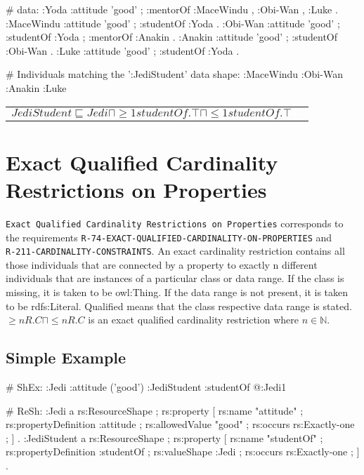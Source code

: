 \documentclass{llncs}
\newcommand{\ms}[1]{\texttt{#1}}
\newenvironment{DL}{
  \vspace{0cm}
	\begin{center}
  \begin{tabular}{r l}

}{
  \end{tabular}
	\end{center}
}
\newcommand{\tb}[1]{\todo[size=\small, color=blue!40]{\textbf{Thomas:} #1}}
\begin{document}
\begin{ex}
# data:
:Yoda 
    :attitude 'good' ;
    :mentorOf :MaceWindu , :Obi-Wan , :Luke .
:MaceWindu
    :attitude 'good' ;
    :studentOf :Yoda .
:Obi-Wan 
    :attitude 'good' ;
    :studentOf :Yoda ;
    :mentorOf :Anakin .
:Anakin
    :attitude 'good' ; 
    :studentOf :Obi-Wan .
:Luke
    :attitude 'good' ;
    :studentOf :Yoda .
\end{ex}

\begin{ex}
# Individuals matching the ’:JediStudent’ data shape:
:MaceWindu :Obi-Wan :Anakin :Luke
\end{ex}

\begin{DL}
$JediStudent \sqsubseteq Jedi \sqcap \geq1 studentOf.\top \sqcap \leq1 studentOf.\top$ \\
\end{DL}

\section{Exact Qualified Cardinality Restrictions on Properties}

\ms{Exact Qualified Cardinality Restrictions on Properties} corresponds to the requirements
\ms{R-74-EXACT-QUALIFIED-CARDINALITY-ON-PROPERTIES} and \\
\ms{R-211-CARDINALITY-CONSTRAINTS}.
An exact cardinality restriction contains all those individuals that are connected by a property to exactly n different individuals that are instances of a particular class or data range. 
If the class is missing, it is taken to be owl:Thing. 
If the data range is not present, it is taken to be rdfs:Literal.
Qualified means that the class respective data range is stated. 
$\geq n R. C \sqcap \leq n R. C $ is an exact qualified cardinality restriction where $n \in \mathbb{N}$.

\subsection{Simple Example}


\begin{ex}
# ShEx:
:Jedi {
    :attitude ('good') }
:JediStudent {
    :studentOf @:Jedi{1} }
\end{ex}

\begin{ex}
# ReSh:
:Jedi a rs:ResourceShape ;
    rs:property [
        rs:name "attitude" ;
        rs:propertyDefinition :attitude ;
        rs:allowedValue "good" ;
        rs:occurs rs:Exactly-one ;
    ] .
:JediStudent a rs:ResourceShape ;
    rs:property [
        rs:name "studentOf" ;
        rs:propertyDefinition :studentOf ;
        rs:valueShape :Jedi ;
        rs:occurs rs:Exactly-one ;
    ] .
\end{ex}
\end{document}

